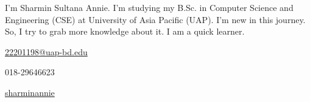 \documentclass[11pt]{spidercv}
\begin{document}
    \PrintableMode

    \begin{TopBar}{\ColorTextSide}

        \SimpleSeparator{\ColorHighlight}

       I'm Sharmin Sultana Annie. I'm studying my B.Sc. in Computer Science and Engineering (CSE) at University of Asia Pacific (UAP). I'm new in this journey. So, I try to grab more knowledge about it. I am a quick learner.
       
        

        \SimpleSeparator{\ColorHighlight}
        \begin{DoubleColumns}
            \begin{ItemList}{\ColorHighlight}
                \item [\Large\faAt] \href{mailto:22201198@uap-bd.edu}{22201198@uap-bd.edu}
                \item [\Large\faMobile] 018-29646623
            \end{ItemList}
            \nextcolumn
            \begin{ItemList}{\ColorHighlight}
                \item [\Large\faGithub] \href{https://github.com/sharminannie}{sharminannie}
            \end{ItemList}
        \end{DoubleColumns}

    \end{TopBar}
\end{document}
